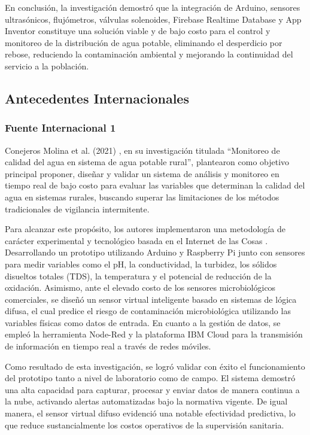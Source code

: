 En conclusión, la investigación demostró que la integración de Arduino, sensores ultrasónicos, flujómetros, válvulas solenoides, Firebase Realtime Database y App Inventor constituye una solución viable y de bajo costo para el control y monitoreo de la distribución de agua potable, eliminando el desperdicio por rebose, reduciendo la contaminación ambiental y mejorando la continuidad del servicio a la población.

\subsection{Antecedentes Internacionales}

\subsubsection{Fuente Internacional 1}
Conejeros Molina et al. (2021) \cite{UniversidadCatolicaTemuco2021}, en su investigación titulada “Monitoreo de calidad del agua en sistema de agua potable rural”, plantearon como objetivo principal proponer, diseñar y validar un sistema de análisis y monitoreo en tiempo real de bajo costo para evaluar las variables que determinan la calidad del agua en sistemas rurales, buscando superar las limitaciones de los métodos tradicionales de vigilancia intermitente.

Para alcanzar este propósito, los autores implementaron una metodología de carácter experimental y tecnológico basada en el Internet de las Cosas . Desarrollando un prototipo utilizando Arduino y Raspberry Pi junto con sensores para medir variables como el pH, la conductividad, la turbidez, los sólidos disueltos totales (TDS), la temperatura y el potencial de reducción de la oxidación. Asimismo, ante el elevado costo de los sensores microbiológicos comerciales, se diseñó un sensor virtual inteligente basado en sistemas de lógica difusa, el cual predice el riesgo de contaminación microbiológica utilizando las variables físicas como datos de entrada. En cuanto a la gestión de datos, se empleó la herramienta Node-Red y la plataforma IBM Cloud para la transmisión de información en tiempo real a través de redes móviles.

Como resultado de esta investigación, se logró validar con éxito el funcionamiento del prototipo tanto a nivel de laboratorio como de campo. El sistema demostró una alta capacidad para capturar, procesar y enviar datos de manera continua a la nube, activando alertas automatizadas bajo la normativa vigente. De igual manera, el sensor virtual difuso evidenció una notable efectividad predictiva, lo que reduce sustancialmente los costos operativos de la supervisión sanitaria.

